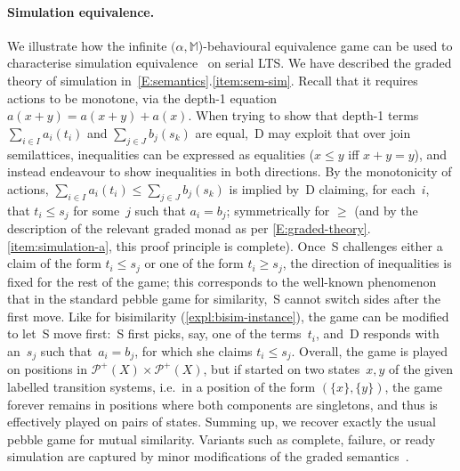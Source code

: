 \documentclass[sigconf,
			final%
			nonacm
                        ]{acmart}
\numberwithin{equation}{section}
\numberwithin{equation}{section}
\theoremstyle{plain}
\theoremstyle{definition}
\newcommand{\M}{\mathbb{M}}                   %
\newcommand{\A}{\mathcal{A}}            %
\newcommand{\pow}{\mathscr P}              %
\newcommand{\powf}{\pow_{\mathsf f}}
\begin{document}
\paragraph*{Simulation equivalence.}
We illustrate how the infinite $(\alpha,\M$)-behavioural equivalence
game can be used to characterise simulation
equivalence~\cite{Glabbeek90} on serial LTS. We have described the
graded theory of simulation
in~\cref{E:semantics}.\ref{item:sem-sim}.  Recall that it requires
actions to be monotone, via the depth-1 equation
\( a(x + y) = a(x+ y) + a(x).  \) When trying to show that depth-1
terms $\sum_{i\in I}a_i(t_i)$ and $\sum_{j\in J}b_j(s_k)$ are \mbox{equal, D}
may exploit that over join semilattices, inequalities can be expressed
as equalities ($x\le y$ iff $x+y=y$), and instead endeavour to show
inequalities in both directions. By the monotonicity of actions,
$\sum_{i\in I}a_i(t_i)\le \sum_{j\in J}b_j(s_k)$ is implied by~D
claiming, for each~$i$, that $t_i\le s_j$ for some~$j$ such that
$a_i=b_j$; symmetrically for $\ge$ (and by the description of the
relevant graded monad as per
\cref{E:graded-theory}.\ref{item:simulation-a}, this proof
principle is complete). Once~S challenges either a claim of the form
$t_i\le s_j$ or one of the form $t_i\ge s_j$, the direction of
inequalities is fixed for the rest of the game; this corresponds to
the well-known phenomenon that in the standard pebble game for
similarity,~S cannot switch sides after the first move. Like for
bisimilarity (\cref{expl:bisim-instance}), the game can be modified
to let~S move first:~S first picks, say, one of the terms~$t_i$, and~D
responds with an~$s_j$ such that~$a_i=b_j$, for which she claims
$t_i\le s_j$. Overall, the game is played on positions in
$\pow^+(X)\times\pow^+(X)$, but if started on two states~$x,y$ of the
given labelled transition systems, i.e.~in a position of the form
$(\{x\},\{y\})$, the game forever remains in positions where both
components are singletons, and thus is effectively played on pairs of
states. Summing up, we recover exactly the usual pebble game for
mutual similarity. Variants such as complete, failure, or ready
simulation are captured by minor modifications of the graded
semantics~\cite{DMS19}.


\end{document}
